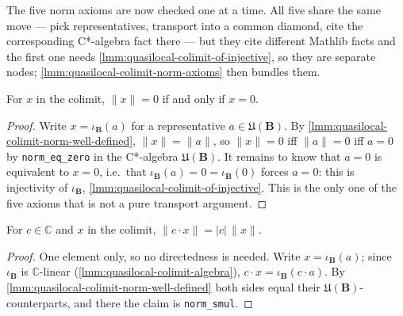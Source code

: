 The five norm axioms are now checked one at a time. All five share the same move --- pick representatives, transport into a common diamond, cite the corresponding C*-algebra fact there --- but they cite different Mathlib facts and the first one needs \ref{lmm:quasilocal-colimit-of-injective}, so they are separate nodes; \ref{lmm:quasilocal-colimit-norm-axioms} then bundles them.

\begin{lemma}
    \label{lmm:quasilocal-colimit-norm-eq-zero}
    For $x$ in the colimit, $\|x\| = 0$ if and only if $x = 0$.
\end{lemma}
\begin{proof}
    Write $x = \iota_{\mathbf{B}}(a)$ for a representative $a \in \mathfrak{U}(\mathbf{B})$. By \ref{lmm:quasilocal-colimit-norm-well-defined}, $\|x\| = \|a\|$, so $\|x\| = 0$ iff $\|a\| = 0$ iff $a = 0$ by \texttt{norm\_eq\_zero} in the C*-algebra $\mathfrak{U}(\mathbf{B})$. It remains to know that $a = 0$ is equivalent to $x = 0$, i.e.\ that $\iota_{\mathbf{B}}(a) = 0 = \iota_{\mathbf{B}}(0)$ forces $a = 0$: this is injectivity of $\iota_{\mathbf{B}}$, \ref{lmm:quasilocal-colimit-of-injective}. This is the only one of the five axioms that is not a pure transport argument.
\end{proof}

\begin{lemma}
    \label{lmm:quasilocal-colimit-norm-smul}
    For $c \in \mathbb{C}$ and $x$ in the colimit, $\|c \cdot x\| = |c|\,\|x\|$.
\end{lemma}
\begin{proof}
    One element only, so no directedness is needed. Write $x = \iota_{\mathbf{B}}(a)$; since $\iota_{\mathbf{B}}$ is $\mathbb{C}$-linear (\ref{lmm:quasilocal-colimit-algebra}), $c \cdot x = \iota_{\mathbf{B}}(c \cdot a)$. By \ref{lmm:quasilocal-colimit-norm-well-defined} both sides equal their $\mathfrak{U}(\mathbf{B})$-counterparts, and there the claim is \texttt{norm\_smul}.
\end{proof}

